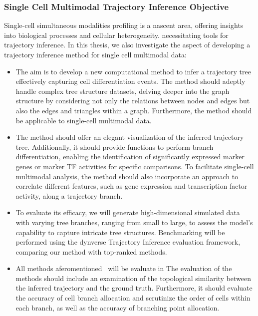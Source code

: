 \subsubsection{Single Cell Multimodal Trajectory Inference Objective}
Single-cell simultaneous modalities profiling is a nascent area, offering insights into biological processes and cellular heterogeneity. necessitating tools for trajectory inference. In this thesis, we also investigate the aspect of developing a trajectory inference method for single cell multimodal data:
\begin{itemize}
	\item 
	The aim is to develop a new computational method to infer a trajectory tree effectively capturing cell differentiation events. The method should adeptly handle complex tree structure datasets, delving deeper into the graph structure by considering not only the relations between nodes and edges but also the edges and triangles within a graph. Furthermore, the method should be applicable to single-cell multimodal data. 
	
	\item 
	The method should offer an elegant visualization of the inferred trajectory tree. Additionally, it should provide functions to perform branch differentiation, enabling the identification of significantly expressed marker genes or marker TF activities for specific comparisons. To facilitate single-cell multimodal analysis, the method should also incorporate an approach to correlate different features, such as gene expression and transcription factor activity, along a trajectory branch.
	
	\item 
	To evaluate its efficacy, we will generate high-dimensional simulated data with varying tree branches, ranging from small to large, to assess the model's capability to capture intricate tree structures. Benchmarking will be performed using the dynverse Trajectory Inference evaluation framework, comparing our method with top-ranked methods.

	\item 
	All methods aferomentioned~ will be evaluate in  The evaluation of the methods should include an examination of the topological similarity between the inferred trajectory and the ground truth. Furthermore, it should evaluate the accuracy of cell branch allocation and scrutinize the order of cells within each branch, as well as the accuracy of branching point allocation.


\end{itemize}
